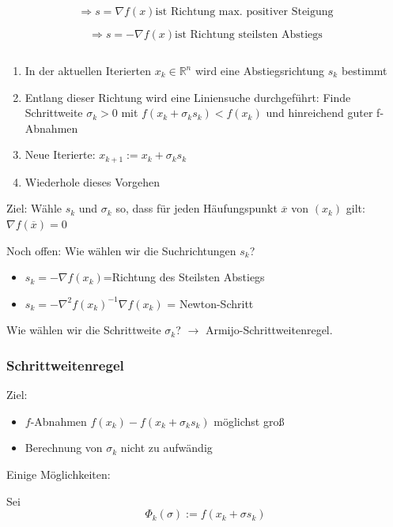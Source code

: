 \documentclass[10pt,a4paper]{article}
\begin{document}
$$\Rightarrow s=\nabla f(x) \text{ist Richtung max. positiver Steigung}$$

$$\Rightarrow s=-\nabla f(x) \text{ist Richtung steilsten Abstiegs}$$


\begin{bsp}
$$ $$
\begin{enumerate}
\item In der aktuellen Iterierten $x_k \in \mathbb{R}^{n}$ wird eine Abstiegsrichtung $s_k$ bestimmt
\item Entlang dieser Richtung wird eine Liniensuche durchgeführt: Finde Schrittweite $\sigma_k>0$ mit $f(x_k+\sigma_k s_k)<f(x_k)$ und hinreichend guter f-Abnahmen
\item Neue Iterierte: $x_{k+1}:=x_k+\sigma_k s_k$
\item Wiederhole dieses Vorgehen
\end{enumerate}

\end{bsp}

Ziel: Wähle $s_k$ und $\sigma_k$ so, dass für jeden Häufungspunkt $\overline{x}$ von $(x_k)$ gilt: $\nabla f(\overline{x})=0$

Noch offen: Wie wählen wir die Suchrichtungen $s_k$?

\begin{itemize}
\item $s_k=-\nabla f(x_k)$=Richtung des Steilsten Abstiegs
\item $s_k=-\nabla^{2} f(x_k)^{-1} \nabla f(x_k)$ = Newton-Schritt
\end{itemize}

Wie wählen wir die Schrittweite $\sigma_k$? $\rightarrow$ Armijo-Schrittweitenregel.

\subsubsection{Schrittweitenregel}
Ziel:

\begin{itemize}
\item $f$-Abnahmen $f(x_k)-f(x_k+\sigma_k s_k)$ möglichst groß
\item Berechnung von $\sigma_k$ nicht zu aufwändig
\end{itemize}

Einige Möglichkeiten:

Sei $$\Phi_k(\sigma):=f(x_k+\sigma s_k)$$
\end{document}
